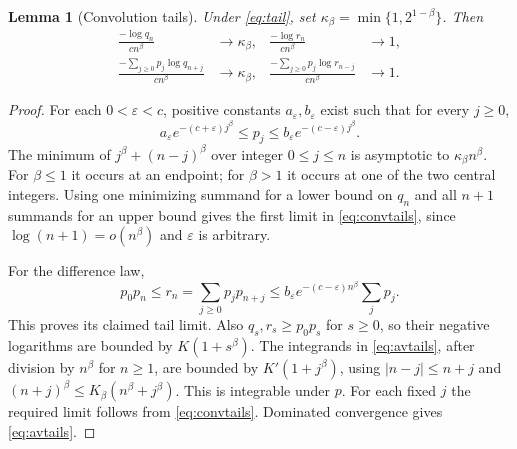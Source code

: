 \documentclass[11pt]{article}
\newtheorem{lemma}[theorem]{Lemma}
\theoremstyle{remark}\newtheorem{remark}[theorem]{Remark}
\begin{document}
\begin{lemma}[Convolution tails]\label{lem:tails}
Under \eqref{eq:tail}, set $\kappa_\beta=\min\{1,2^{1-\beta}\}$. Then
\begin{align}
 \frac{-\log q_n}{c n^\beta}&\longrightarrow\kappa_\beta,
 &\frac{-\log r_n}{c n^\beta}&\longrightarrow1,\label{eq:convtails}\\
 \frac{-\sum_{j\geq0}p_j\log q_{n+j}}{c n^\beta}
 &\longrightarrow\kappa_\beta,
 &\frac{-\sum_{j\geq0}p_j\log r_{n-j}}{c n^\beta}
 &\longrightarrow1.\label{eq:avtails}
\end{align}
\end{lemma}
\begin{proof}
For each $0<\varepsilon<c$, positive constants $a_\varepsilon,b_\varepsilon$
exist such that for every $j\geq0$,
\[
 a_\varepsilon e^{-(c+\varepsilon)j^\beta}
 \leq p_j\leq
 b_\varepsilon e^{-(c-\varepsilon)j^\beta}.
\]
The minimum of $j^\beta+(n-j)^\beta$ over integer $0\leq j\leq n$ is
asymptotic to $\kappa_\beta n^\beta$. For $\beta\leq1$ it occurs at an
endpoint; for $\beta>1$ it occurs at one of the two central integers.
Using one minimizing summand for a lower bound on $q_n$ and all $n+1$
summands for an upper bound gives the first limit in \eqref{eq:convtails},
since $\log(n+1)=o(n^\beta)$ and $\varepsilon$ is arbitrary.

For the difference law,
\[
 p_0p_n\leq r_n=\sum_{j\geq0}p_jp_{n+j}
 \leq b_\varepsilon e^{-(c-\varepsilon)n^\beta}\sum_jp_j.
\]
This proves its claimed tail limit. Also $q_s,r_s\geq p_0p_s$ for $s\geq0$,
so their negative logarithms are bounded by $K(1+s^\beta)$. The integrands
in \eqref{eq:avtails}, after division by $n^\beta$ for $n\geq1$, are
bounded by $K'(1+j^\beta)$, using $|n-j|\leq n+j$ and
$(n+j)^\beta\leq K_\beta(n^\beta+j^\beta)$. This is integrable under $p$.
For each fixed $j$ the required limit follows from \eqref{eq:convtails}.
Dominated convergence gives \eqref{eq:avtails}.
\end{proof}
\end{document}
